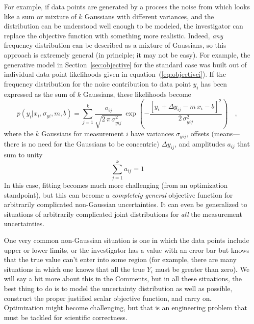 \documentclass[12pt,twoside]{article}
\newcommand{\sectionname}{Section}
\newcommand{\equationname}{equation}
\newcommand{\commentsname}{Comments}
\newcounter{problem}
\begin{document}
For example, if data points are generated by a process the noise from
which looks like a sum or mixture of $k$ Gaussians with different
variances, and the distribution can be understood well enough to be
modeled, the investigator can replace the objective function with
something more realistic.  Indeed, \emph{any} frequency distribution
can be described as a mixture of Gaussians, so this approach is
extremely general (in principle; it may not be easy).  For example,
the generative model in \sectionname~\ref{sec:objective} for the
standard case was built out of individual data-point likelihoods given
in \equationname~(\ref{eq:objectivei}).  If the frequency distribution
for the noise contribution to data point $y_i$ has been expressed as
the sum of $k$ Gaussians, these likelihoods become
\begin{equation}
p(y_i|x_i,\sigma_{yi},m,b) = \sum_{j=1}^k
 \frac{a_{ij}}{\sqrt{2\,\pi\,\sigma_{yij}^2}}
 \,\exp\left(-\frac{[y_i+\Delta y_{ij}-m\,x_i-b]^2}{2\,\sigma_{yij}^2}\right)
 \quad ,
\end{equation}
where the $k$ Gaussians for measurement $i$ have variances
$\sigma_{yij}$, offsets (means---there is no need for the Gaussians to
be concentric) $\Delta y_{ij}$, and amplitudes $a_{ij}$ that sum to
unity
\begin{equation}
\sum_{j=1}^k a_{ij} = 1
\end{equation}
In this case, fitting becomes much more challenging (from an
optimization standpoint), but this can become a \emph{completely
  general} objective function for arbitrarily complicated non-Gaussian
uncertainties.  It can even be generalized to situations of
arbitrarily complicated joint distributions for \emph{all} the
measurement uncertainties.

One very common non-Gaussian situation is one in which the data points
include upper or lower limits, or the investigator has a value with an
error bar but knows that the true value can't enter into some region
(for example, there are many situations in which one knows that all
the true $Y_i$ must be greater than zero).  We will say a bit more
about this in the \commentsname, but in all these situations, the best
thing to do is to model the uncertainty distribution as well as
possible, construct the proper justified scalar objective function,
and carry on.  Optimization might become challenging, but that is an
engineering problem that must be tackled for scientific correctness.
\end{document}

